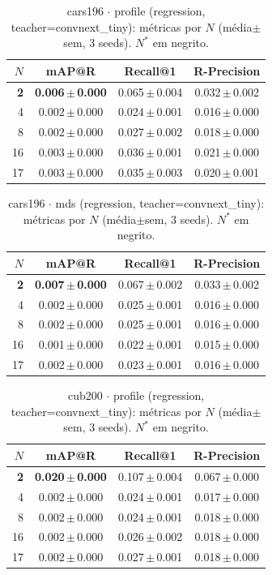 
\begin{table}[t]\centering
\caption{cars196 $\cdot$ profile (regression, teacher=convnext\_tiny): métricas por $N$ (média$\pm$sem, 3 seeds). $N^*$ em negrito.}
\begin{tabular}{rccc}\toprule
$N$ & mAP@R & Recall@1 & R-Precision \\ \midrule
\textbf{2} & \textbf{0.006\,$\pm$\,0.000} & 0.065\,$\pm$\,0.004 & 0.032\,$\pm$\,0.002 \\
4 & 0.002\,$\pm$\,0.000 & 0.024\,$\pm$\,0.001 & 0.016\,$\pm$\,0.000 \\
8 & 0.002\,$\pm$\,0.000 & 0.027\,$\pm$\,0.002 & 0.018\,$\pm$\,0.000 \\
16 & 0.003\,$\pm$\,0.000 & 0.036\,$\pm$\,0.001 & 0.021\,$\pm$\,0.000 \\
17 & 0.003\,$\pm$\,0.000 & 0.035\,$\pm$\,0.003 & 0.020\,$\pm$\,0.001 \\
\bottomrule\end{tabular}\end{table}

\begin{table}[t]\centering
\caption{cars196 $\cdot$ mds (regression, teacher=convnext\_tiny): métricas por $N$ (média$\pm$sem, 3 seeds). $N^*$ em negrito.}
\begin{tabular}{rccc}\toprule
$N$ & mAP@R & Recall@1 & R-Precision \\ \midrule
\textbf{2} & \textbf{0.007\,$\pm$\,0.000} & 0.067\,$\pm$\,0.002 & 0.033\,$\pm$\,0.002 \\
4 & 0.002\,$\pm$\,0.000 & 0.025\,$\pm$\,0.001 & 0.016\,$\pm$\,0.000 \\
8 & 0.002\,$\pm$\,0.000 & 0.025\,$\pm$\,0.001 & 0.016\,$\pm$\,0.000 \\
16 & 0.001\,$\pm$\,0.000 & 0.022\,$\pm$\,0.001 & 0.015\,$\pm$\,0.000 \\
17 & 0.002\,$\pm$\,0.000 & 0.023\,$\pm$\,0.001 & 0.016\,$\pm$\,0.000 \\
\bottomrule\end{tabular}\end{table}

\begin{table}[t]\centering
\caption{cub200 $\cdot$ profile (regression, teacher=convnext\_tiny): métricas por $N$ (média$\pm$sem, 3 seeds). $N^*$ em negrito.}
\begin{tabular}{rccc}\toprule
$N$ & mAP@R & Recall@1 & R-Precision \\ \midrule
\textbf{2} & \textbf{0.020\,$\pm$\,0.000} & 0.107\,$\pm$\,0.004 & 0.067\,$\pm$\,0.000 \\
4 & 0.002\,$\pm$\,0.000 & 0.024\,$\pm$\,0.001 & 0.017\,$\pm$\,0.000 \\
8 & 0.002\,$\pm$\,0.000 & 0.024\,$\pm$\,0.001 & 0.018\,$\pm$\,0.000 \\
16 & 0.002\,$\pm$\,0.000 & 0.026\,$\pm$\,0.002 & 0.018\,$\pm$\,0.000 \\
17 & 0.002\,$\pm$\,0.000 & 0.027\,$\pm$\,0.001 & 0.018\,$\pm$\,0.000 \\
\bottomrule\end{tabular}\end{table}

